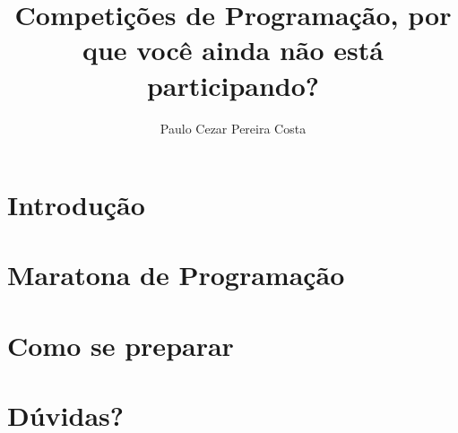 \documentclass{beamer}
\title[]{Competições de Programação, por que você ainda não está participando?}
\author[{\tiny Paulo Cezar}]{Paulo Cezar Pereira Costa}
\institute[{\tiny INF/UFG}]{Instituto de Informática\\
           Universidade Federal de Goiás}
\begin{document}
\maketitle

\section{Introdução}


\section{Maratona de Programação}


\section{Como se preparar}


\section{Dúvidas?}
\end{document}
